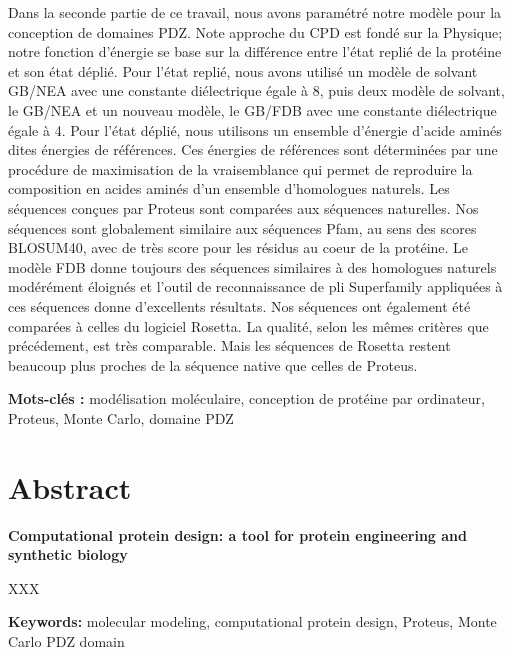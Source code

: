 Dans la seconde partie de ce travail, nous avons paramétré notre modèle pour la conception de domaines PDZ. Note approche du CPD est fondé sur la Physique; notre fonction d'énergie se base sur la différence entre l'état replié de la protéine et son état déplié. Pour l'état replié, nous avons utilisé un modèle de solvant GB/NEA avec une constante diélectrique égale à 8, puis  deux modèle de solvant, le GB/NEA et un nouveau modèle, le GB/FDB avec une constante diélectrique égale à 4. Pour l'état déplié, nous utilisons un ensemble d'énergie d'acide aminés dites énergies de références. Ces énergies de références sont déterminées par une procédure de maximisation de la vraisemblance qui permet de reproduire la composition en acides aminés d'un ensemble d'homologues naturels. Les séquences conçues par Proteus sont comparées aux séquences naturelles. Nos séquences sont globalement similaire aux séquences Pfam, au sens des scores BLOSUM40, avec de très score pour les résidus au coeur de la protéine. Le modèle FDB donne toujours des séquences similaires à des homologues naturels modérément éloignés et l'outil de reconnaissance de pli Superfamily appliquées à ces séquences donne d'excellents résultats. Nos séquences ont également été comparées à celles du logiciel Rosetta. La qualité, selon les mêmes critères que précédement, est très comparable. Mais les séquences de Rosetta restent beaucoup plus proches de la séquence native que celles de Proteus.   


\bigskip

\textbf{Mots-clés :} modélisation moléculaire, conception de protéine par ordinateur, Proteus, Monte Carlo, domaine PDZ

\vfill



\section*{Abstract}

{\large\bf\noindent Computational protein design: a tool for protein engineering and synthetic biology}

\bigskip

XXX

\bigskip

\textbf{Keywords:} molecular modeling, computational protein design, Proteus, Monte Carlo PDZ domain



